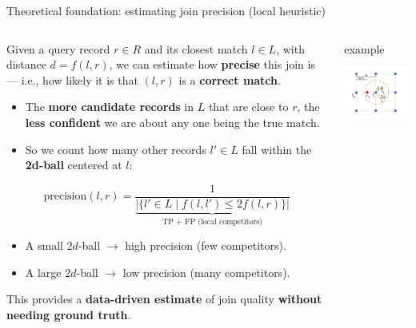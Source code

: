 \documentclass[8pt]{beamer} %
\begin{document}
\begin{frame}{Theoretical foundation: estimating join precision (local heuristic)}
	\begin{columns}
		\begin{column}{0.4\textwidth}
			Given a query record $r \in R$ and its closest match $l \in L$, with distance $d = f(l, r)$, we can estimate how \textbf{precise} this join is — i.e., how likely it is that $(l, r)$ is a \textbf{correct match}.
			

			\begin{itemize}
				\item The \textbf{more candidate records} in $L$ that are close to $r$, the \textbf{less confident} we are about any one being the true match.
				\item So we count how many other records $l' \in L$ fall within the \textbf{2d-ball} centered at $l$:
			\end{itemize}
			
			$$
			\text{precision}(l, r) =
			\frac{1}{
				\underbrace{|\{ l' \in L \mid f(l, l') \leq 2f(l, r) \}|}_{\text{TP + FP (local competitors)}}
			}
			$$
			
			\begin{itemize}
				\item A small 2$d$-ball $\rightarrow$ high precision (few competitors).
				\item A large 2$d$-ball $\rightarrow$ low precision (many competitors).
			\end{itemize}
			

			This provides a \textbf{data-driven estimate} of join quality \textbf{without needing ground truth}.
		\end{column}


		\begin{column}{0.4\textwidth}
			\begin{beamercolorbox}[rounded=true, shadow=true, leftskip=1em, rightskip=1em]{example}		
				
				\centering
				\includegraphics[width=0.7\linewidth]{img/img-join-precision-complete.png}
				

\end{beamercolorbox}
\end{column}
\end{columns}
\end{frame}
\end{document}
